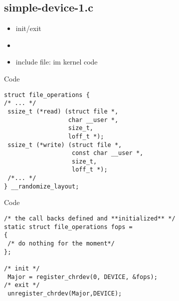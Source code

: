 \subsection{simple-device-1.c}
\begin{frame}{}
  \begin{itemize}
   \item init/exit
   \item {}
   \item include file:  im kernel code
  \end{itemize}
  
\end{frame}

\begin{frame}[fragile]{Code}{}
\begin{lstlisting}
struct file_operations {
/* ... */
 ssize_t (*read) (struct file *, 
                  char __user *, 
                  size_t, 
                  loff_t *);
 ssize_t (*write) (struct file *, 
                   const char __user *, 
                   size_t, 
                   loff_t *);
 /*... */
} __randomize_layout;
\end{lstlisting}
\end{frame}

\begin{frame}[fragile]{Code}
\begin{lstlisting}
/* the call backs defined and **initialized** */
static struct file_operations fops =  
{
 /* do nothing for the moment*/
};

/* init */
 Major = register_chrdev(0, DEVICE, &fops);
/* exit */
 unregister_chrdev(Major,DEVICE);

  \end{lstlisting}
\end{frame}
